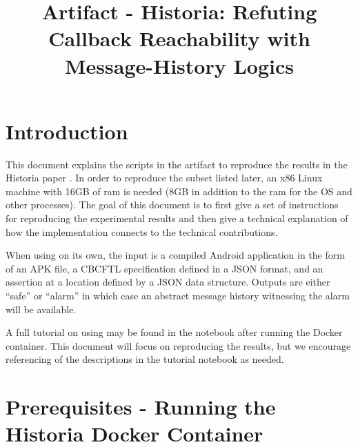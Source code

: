 \documentclass{article} %
\begin{document}

\newcommand{\newls}{CBCFTL\xspace}
%
\title{Artifact - Historia: Refuting Callback Reachability with Message-History Logics}



\maketitle



%
\section{Introduction}
This document explains the scripts in the artifact to reproduce the results in the Historia paper \cite{conf/oopsla/Meier23}.
In order to reproduce the subset listed later, an x86 Linux machine with 16GB of ram is needed (8GB in addition to the ram for the OS and other processes).
The goal of this document is to first give a set of instructions for reproducing the experimental results and then give a technical explanation of how the implementation connects to the technical contributions.

When using \toolname on its own, the input is a compiled Android application in the form of an APK file, a \newls specification defined in a JSON format, and an assertion at a location defined by a JSON data structure.
Outputs are either ``safe'' or ``alarm'' in which case an abstract message history witnessing the alarm will be available.

A full tutorial on using \toolname may be found in the notebook  after running the Docker container.  
This document will focus on reproducing the results, but we encourage referencing of the descriptions in the tutorial notebook as needed.

\section{Prerequisites - Running the Historia Docker Container}
\end{document}
